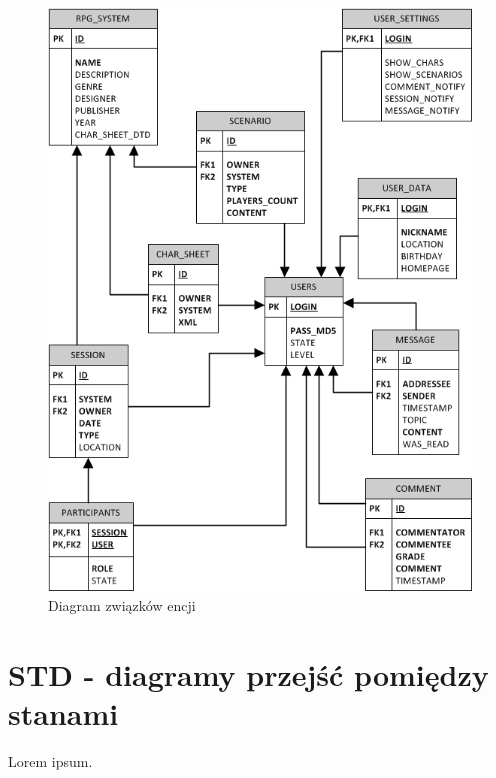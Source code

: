 \begin{figure}[h!]
\begin{center}
\includegraphics[scale=1]{./img/ERD.png}
\caption[Diagram związków encji]{Diagram związków encji}
\label{fig:ERD}
\end{center}
\end{figure}


\clearpage
\section{STD - diagramy przejść pomiędzy stanami}
\label{sec:STD}

Lorem ipsum.